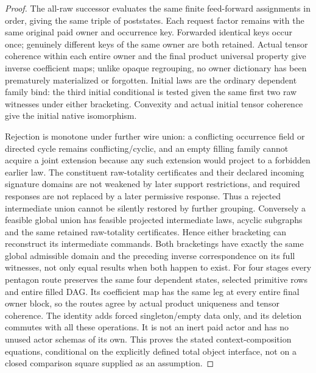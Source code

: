 \documentclass[11pt]{article}\usepackage{amsmath,amssymb,amsthm,geometry}\geometry{margin=1in}
\begin{document}
\begin{proof}
The all-raw successor evaluates the same finite feed-forward assignments in order, giving the same triple of poststates. Each request factor remains with the same original paid owner and occurrence key. Forwarded identical keys occur once; genuinely different keys of the same owner are both retained. Actual tensor coherence within each entire owner and the final product universal property give inverse coefficient maps; unlike opaque regrouping, no owner dictionary has been prematurely materialized or forgotten. Initial laws are the ordinary dependent family bind: the third initial conditional is tested given the same first two raw witnesses under either bracketing. Convexity and actual initial tensor coherence give the initial native isomorphism.

Rejection is monotone under further wire union: a conflicting occurrence field or directed cycle remains conflicting/cyclic, and an empty filling family cannot acquire a joint extension because any such extension would project to a forbidden earlier law. The constituent raw-totality certificates and their declared incoming signature domains are not weakened by later support restrictions, and required responses are not replaced by a later permissive response. Thus a rejected intermediate union cannot be silently restored by further grouping. Conversely a feasible global union has feasible projected intermediate laws, acyclic subgraphs and the same retained raw-totality certificates. Hence either bracketing can reconstruct its intermediate commands. Both bracketings have exactly the same global admissible domain and the preceding inverse correspondence on its full witnesses, not only equal results when both happen to exist. For four stages every pentagon route preserves the same four dependent states, selected primitive rows and entire filled DAG. Its coefficient map has the same leg at every entire final owner block, so the routes agree by actual product uniqueness and tensor coherence. The identity adds forced singleton/empty data only, and its deletion commutes with all these operations. It is not an inert paid actor and has no unused actor schemas of its own. This proves the stated context-composition equations, conditional on the explicitly defined total object interface, not on a closed comparison square supplied as an assumption.\end{proof}
\end{document}
